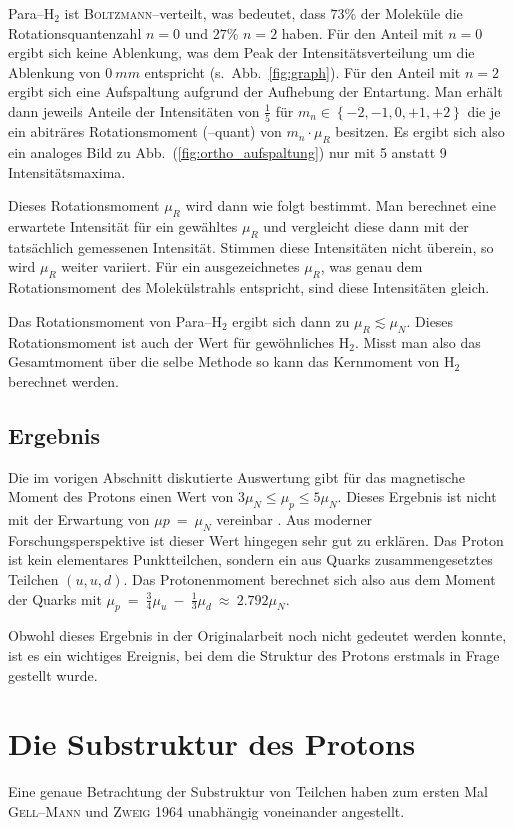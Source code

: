 \documentclass[sn-mathphys-num,iicol]{sn-jnl}
\theoremstyle{thmstyleone}
\theoremstyle{thmstyletwo}
\theoremstyle{thmstylethree}
\begin{document}
Para--$\text{H}_2$ ist \textsc{Boltzmann}--verteilt, was bedeutet, dass $73\%$ der Moleküle die Rotationsquantenzahl $n=0$ und $27\%$ $n=2$ haben.
Für den Anteil mit $n=0$ ergibt sich keine Ablenkung, was dem Peak der Intensitätsverteilung um die Ablenkung von $\SI{0}{mm}$ entspricht (s.\ Abb.\ \ref{fig:graph}).
Für den Anteil mit $n=2$ ergibt sich eine Aufspaltung aufgrund der Aufhebung der Entartung.
Man erhält dann jeweils Anteile der Intensitäten von $\tfrac{1}{5}$ für $m_n\in\left\{-2,-1,0,+1,+2\right\}$ die je ein abiträres Rotationsmoment (--quant) von $m_n\cdot \mu _R$ besitzen.
Es ergibt sich also ein analoges Bild zu Abb.\ (\ref{fig:ortho_aufspaltung}) nur mit 5 anstatt 9 Intensitätsmaxima.

Dieses Rotationsmoment $\mu _R$ wird dann wie folgt bestimmt.
Man berechnet eine erwartete Intensität für ein gewähltes $\mu _R$ und vergleicht diese dann mit der tatsächlich gemessenen Intensität.
Stimmen diese Intensitäten nicht überein, so wird $\mu _R$ weiter variiert.
Für ein ausgezeichnetes $\mu _R$, was genau dem Rotationsmoment des Molekülstrahls entspricht, sind diese Intensitäten gleich.

Das Rotationsmoment von Para--$\text{H}_2$ ergibt sich dann zu $\mu _R\lesssim \mu _N$.
Dieses Rotationsmoment ist auch der Wert für gewöhnliches $\text{H}_2$.
Misst man also das Gesamtmoment über die selbe Methode so kann das Kernmoment von $\text{H}_2$ berechnet werden.\cite{FrischStern1933}

\subsection{Ergebnis}
Die im vorigen Abschnitt diskutierte Auswertung gibt für das magnetische Moment des Protons einen Wert von $3\mu _N\leq \mu _p\leq 5\mu _N$.
Dieses Ergebnis ist nicht mit der Erwartung von $\mu p~=~\mu _N$ vereinbar \cite{FrischStern1933}.
Aus moderner Forschungsperspektive ist dieser Wert hingegen sehr gut zu erklären.
Das Proton ist kein elementares Punktteilchen, sondern ein aus Quarks zusammengesetztes Teilchen $\left(u,u,d\right)$.
Das Protonenmoment berechnet sich also aus dem Moment der Quarks mit $\mu _p~=~\tfrac{3}{4}\mu _u~-~\tfrac{1}{3}\mu _d~\approx~ 2.792\mu _N$\cite{CODATA_proton_magneton}.

Obwohl dieses Ergebnis in der Originalarbeit noch nicht gedeutet werden konnte, ist es ein wichtiges Ereignis, bei dem die Struktur des Protons erstmals in Frage gestellt wurde.

\section{Die Substruktur des Protons}
Eine genaue Betrachtung der Substruktur von Teilchen haben zum ersten Mal \textsc{Gell--Mann}\cite{Gellmann1964} und \textsc{Zweig}\cite{Zweig1964} 1964 unabhängig voneinander angestellt.
\end{document}
